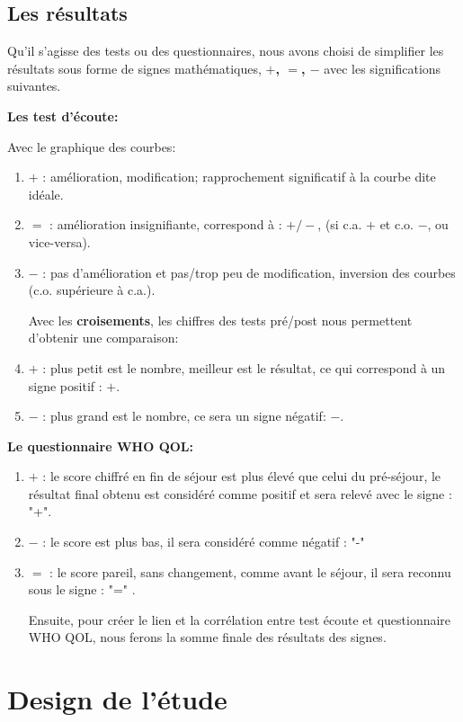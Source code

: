  \subsection{Les résultats} 
Qu'il s'agisse des tests ou des questionnaires, nous avons choisi de
simplifier les résultats sous forme de signes
mathématiques,  \textbf{ $+$, $=$, $-$ } avec les significations suivantes.


\textbf { Les test d'écoute: } 


Avec  le graphique des courbes:
\begin{enumerate}
	\item$+$   : amélioration, modification;  rapprochement significatif à la courbe dite idéale.
	\item$=$   : amélioration insignifiante, correspond à : $+/-$, (si c.a. $ + $ et c.o. $-$, ou vice-versa).
	
	\item$-$   : pas d'amélioration et pas/trop peu  de modification, inversion
	des courbes (c.o. supérieure à c.a.).
	
	Avec les \textbf{croisements}, les chiffres des tests pré/post
	nous permettent d'obtenir une comparaison:
	\item $+$ : plus petit est le nombre, meilleur est le résultat, ce qui correspond à un signe positif : $+$.
	\item$-$   : plus grand est le nombre, ce sera un signe négatif: $-$.
\end{enumerate}

\textbf{Le questionnaire WHO QOL:} 	
\begin{enumerate}
\item$+$  :  le score chiffré  en fin de séjour est plus élevé
que celui du
pré-séjour, le résultat final obtenu est considéré comme
positif et sera relevé  avec le signe : "+". 
\item $-$ : le score est plus bas, il  sera considéré comme négatif : "-"  
\item$=$ : le score pareil, sans changement,  comme avant le séjour, il sera reconnu sous le signe :  "=" .

Ensuite, pour créer le lien et la corrélation entre test écoute et questionnaire WHO QOL, nous ferons la 
somme finale des résultats des signes.
\end{enumerate}
\section{Design de l'étude}

